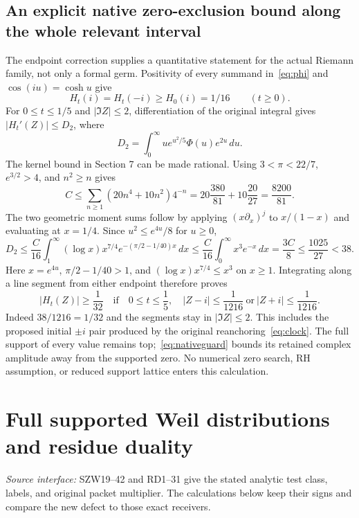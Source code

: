 \documentclass[11pt,a4paper]{article}
\theoremstyle{definition}\newtheorem{definition}[theorem]{Definition}\newtheorem{remark}[theorem]{Remark}
\newcommand{\src}[1]{\textit{Source interface:} #1}
\begin{document}
\subsection{An explicit native zero-exclusion bound along the whole relevant interval}
The endpoint correction supplies a quantitative statement for the actual Riemann family, not only a formal germ. Positivity of every summand in~\eqref{eq:phi} and $\cos(iu)=\cosh u$ give
\[
 H_t(i)=H_t(-i)\ge H_0(i)=1/16\qquad(t\ge0).
\]
For $0\le t\le1/5$ and $|\Im Z|\le2$, differentiation of the original integral gives $|H_t'(Z)|\le D_2$, where
\[
 D_2=\int_0^\infty u e^{u^2/5}\Phi(u)e^{2u}\,du.
\]
The kernel bound in Section 7 can be made rational. Using $3<\pi<22/7$, $e^{3/2}>4$, and $n^2\ge n$ gives
\[
 C\le\sum_{n\ge1}(20n^4+10n^2)4^{-n}
 =20\frac{380}{81}+10\frac{20}{27}=\frac{8200}{81}.
\]
The two geometric moment sums follow by applying $(x\partial_x)^j$ to $x/(1-x)$ and evaluating at $x=1/4$. Since $u^2\le e^{4u}/8$ for $u\ge0$,
\[
 D_2\le\frac C{16}\int_1^\infty (\log x)x^{7/4}
             e^{-(\pi/2-1/40)x}\,dx
 \le\frac C{16}\int_0^\infty x^3e^{-x}\,dx
 =\frac{3C}{8}\le\frac{1025}{27}<38.
\]
Here $x=e^{4u}$, $\pi/2-1/40>1$, and $(\log x)x^{7/4}\le x^3$ on $x\ge1$. Integrating along a line segment from either endpoint therefore proves
\begin{equation}
 \boxed{\quad |H_t(Z)|\ge\frac1{32}
 \quad\text{if}\quad 0\le t\le\frac15,\quad
 |Z-i|\le\frac1{1216}\ \text{or}\ |Z+i|\le\frac1{1216}.\quad}
                                                        \label{eq:nativeguard}
\end{equation}
Indeed $38/1216=1/32$ and the segments stay in $|\Im Z|\le2$. This includes the proposed initial $\pm i$ pair produced by the original reanchoring~\eqref{eq:clock}. The full support of every value remains top;~\eqref{eq:nativeguard} bounds its retained complex amplitude away from the supported zero. No numerical zero search, RH assumption, or reduced support lattice enters this calculation.

\section{Full supported Weil distributions and residue duality}\label{sec:residue}
\src{SZW19--42 and RD1--31 give the stated analytic test class, labels, and original packet multiplier. The calculations below keep their signs and compare the new defect to those exact receivers.}
\end{document}
